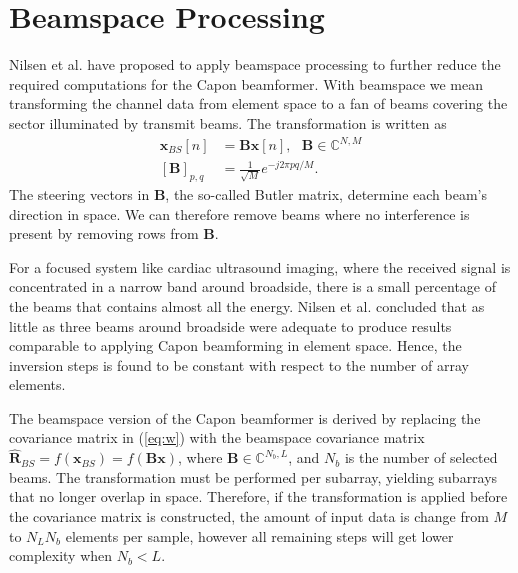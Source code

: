 \documentclass[12pt,journal,onecolumn]{IEEEtran}
\newcommand{\mat}[1]{\mathbf{#1}}
\renewcommand{\vec}[1]{\mathbf{#1}}
\begin{document}
\section{Beamspace Processing}\label{sec:bs}
Nilsen et al. \cite{Nilsen2009} have proposed to apply beamspace processing to further reduce the required computations for the Capon beamformer. With beamspace we mean transforming the channel data from element space to a fan of beams covering the sector illuminated by transmit beams. The transformation is written as
\begin{align}
\vec{x}_{BS}[n] &= \mat{B}\vec{x}[n], \ \ \ \mat{B} \in \mathbb{C}^{N,M}\\
[\mat{B}]_{p,q} &= \frac{1}{\sqrt{M}}e^{-j 2 \pi p q / M}.
\end{align} 
The steering vectors in $\mat{B}$, the so-called Butler matrix, determine each beam's direction in space. We can therefore remove beams where no interference is present by removing rows from $\mat{B}$. 

For a focused system like cardiac ultrasound imaging, where the received signal is concentrated in a narrow band around broadside, there is a small percentage of the beams that contains almost all the energy. Nilsen et al. concluded that as little as three beams around broadside were adequate to produce results comparable to applying Capon beamforming in element space. Hence, the inversion steps is found to be constant with respect to the number of array elements.

The beamspace version of the Capon beamformer is derived by replacing the covariance matrix in (\ref{eq:w}) with the beamspace covariance matrix $\mat{\hat{R}}_{BS} = f(\vec{x}_{BS}) = f(\mat{B}\vec{x})$, where $\mat{B} \in \mathbb{C}^{N_b,L}$, and $N_b$ is the number of selected beams. The transformation must be performed per subarray, yielding subarrays that no longer overlap in space. Therefore, if the transformation is applied before the covariance matrix is constructed, the amount of input data is change from $M$ to $N_LN_b$ elements per sample, however all remaining steps will get lower complexity when $N_b < L$.
\end{document}
